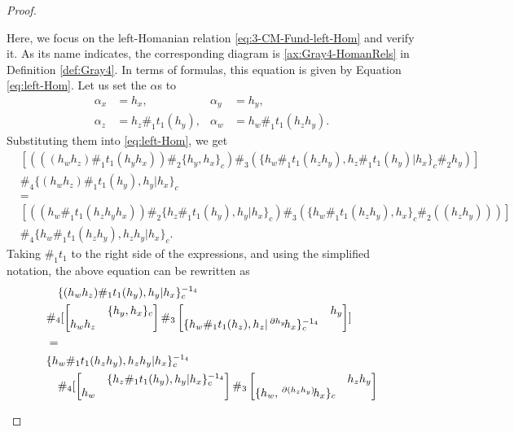 \documentclass[11pt, reqno]{amsart} %
\newcommand{\act}[1]{\,\sp{#1}\!}
\theoremstyle{definition}
\theoremstyle{remark}
\numberwithin{equation}{section}
\begin{document}
\begin{proof}
\begin{enumerate}
  Here, we focus on the left-Homanian relation \eqref{eq:3-CM-Fund-left-Hom} and verify it. As its name indicates, the corresponding diagram is \ref{ax:Gray4-HomanRels} in Definition \ref{def:Gray4}. In terms of formulas, this equation is given by Equation \eqref{eq:left-Hom}. Let us set the $\alpha$s to
  \begin{align*}
    \alpha_x &= h_x, &
    \alpha_y &= h_y, \\
    \alpha_z &= h_z\#_1t_1(h_y), &
    \alpha_w &= h_w\#_1t_1(h_zh_y).
  \end{align*}
  Substituting them into \eqref{eq:left-Hom}, we get
  \begin{align*}
    &
    [
      (((h_wh_z)\#_1t_1(h_yh_x))\#_2\{h_y,h_x\}_c)
      \#_3
      (\{h_w\#_1t_1(h_zh_y),h_z\#_1t_1(h_y)|h_x\}_c\#_2h_y)
    ] \\
    &\#_4
    \{(h_wh_z)\#_1t_1(h_y),h_y|h_x\}_c \\
    &= \\
    &
    [
      ((h_w\#_1t_1(h_zh_yh_x))\#_2\{h_z\#_1t_1(h_y),h_y|h_x\}_c)
      \#_3
      (\{h_w\#_1t_1(h_zh_y),h_x\}_c\#_2((h_zh_y)))
    ] \\
    &\#_4
    \{h_w\#_1t_1(h_zh_y),h_zh_y|h_x\}_c.
  \end{align*}
  Taking $\#_1t_1$ to the right side of the expressions, and using the simplified notation, the above equation can be rewritten as
  \begin{align*}
    &\quad 
    \{(h_wh_z)\#_1t_1(h_y),h_y|h_x\}_c^{-1_4} \\
    & \#_4
    [
      \begin{bmatrix} & \{h_y,h_x\}_c\\ h_wh_z&\end{bmatrix}
      \#_3
      \begin{bmatrix}& h_y\\ \{h_w\#_1t_1(h_z),h_z|\act{\partial h_y}h_x\}_c^{-1_4} & \end{bmatrix}
    ] \\
    &= \\
    &
    \{h_w\#_1t_1(h_zh_y),h_zh_y|h_x\}_c^{-1_4} \\
    &\quad \#_4
    [
      \begin{bmatrix} & \{h_z\#_1t_1(h_y),h_y|h_x\}_c^{-1_4}\\ h_w&\end{bmatrix}
      \#_3
      \begin{bmatrix}& h_zh_y\\ \{h_w,\act{\partial(h_zh_y)}h_x\}_c&\end{bmatrix}

\end{align*}
\end{enumerate}
\end{proof}
\end{document}
